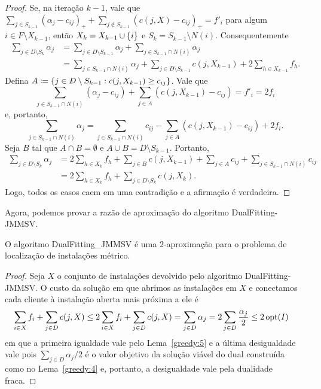 \begin{proof}
Se, na iteração $k-1$, vale que $\sum_{j \in S_{k-1}} (\alpha_j - c_{ij})_+ + \sum_{j \not \in S_{k-1}}(c(j,X) - c_{ij})_+ = f'_i$ para algum $i \in F \setminus X_{k-1}$, então $X_k = X_{k-1} \cup \{i\}$ e $S_k = S_{k-1} \setminus N(i)$. Consequentemente 
\begin{align*}
\sum_{j \in D \setminus S_k} \alpha_j &= \sum_{j \in D\setminus S_{k-1}} \alpha_j + \sum_{j \in S_{k-1}\cap N(i)} \alpha_j \\
&= \sum_{j \in S_{k-1}\cap N(i)} \alpha_j +  \sum_{j \in D\setminus S_{k-1}}c(j,X_{k-1}) + 2 \sum_{h \in X_{k-1}} f_h.
\end{align*}
Defina $A\coloneqq \{j \in D\setminus S_{k-1}: c(j,X_{k-1}) \geq c_{ij}\}$. Vale que
\[ \sum_{j \in S_{k-1}\cap N(i)} (\alpha_j - c_{ij}) + \sum_{j \in A} (c(j,X_{k-1}) - c_{ij}) = f'_i = 2f_i \]
e, portanto,
\[ \sum_{j \in S_{k-1}\cap N(i)} \alpha_j = \sum_{j \in S_{k-1}\cap N(i)} c_{ij} - \sum_{j \in A} (c(j,X_{k-1}) - c_{ij}) + 2f_i. \]
Seja $B$ tal que $A \cap B = \emptyset$ e $A \cup B = D\setminus S_{k-1}$. Portanto,
\begin{subequations}
\begin{align*}
\sum_{j \in D \setminus S_k} \alpha_j &= 2\sum_{h \in X_k} f_h + \sum_{j \in B} c(j,X_{k-1}) + \sum_{j \in A} c_{ij} + \sum_{j \in S_{k-1} \cap N(i)} c_{ij}\\
&= 2 \sum_{h \in X_k} f_h + \sum_{j \in D \setminus S_k} c(j,X_k). 
\end{align*}
\end{subequations}
Logo, todos os casos caem em uma contradição e a afirmação é verdadeira.
\end{proof}

Agora, podemos provar a razão de aproximação do algoritmo {\sc DualFitting-JMMSV}.

\begin{theorem}
O algoritmo {\sc DualFitting\_JMMSV} é uma 2-aproximação para o problema de localização de instalações métrico.
\end{theorem} 
\begin{proof}
Seja $X$ o conjunto de instalações devolvido pelo algoritmo {\sc DualFitting-JMMSV}. O custo da solução em que abrimos as instalações em $X$ e conectamos cada cliente à instalação aberta mais próxima a ele é
\begin{subequations}
\begin{align*}
\sum_{i \in X} f_i + \sum_{j \in D}c(j,X) &\leq 2\sum_{i \in X} f_i + \sum_{j \in D}c(j,X) = \sum_{j \in D} \alpha_j = 2\sum_{j \in D} \frac{\alpha_j}{2} \leq 2\, \mathrm{opt}(I)  
\end{align*}
\end{subequations}
em que a primeira igualdade vale pelo Lema~\ref{greedy:5} e a última desigualdade vale pois $\sum_{j \in D} \alpha_j/2 $ é o valor objetivo da solução viável do dual construída como no Lema~\ref{greedy:4} e, portanto, a desigualdade vale pela dualidade fraca.
\end{proof}

